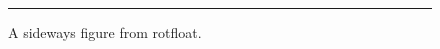\documentclass{article}
\begin{document}
\begin{figure}
\centering
\rule{4cm}{2cm}
\caption{A sideways figure from rotfloat.}
\end{figure}
\end{document}
